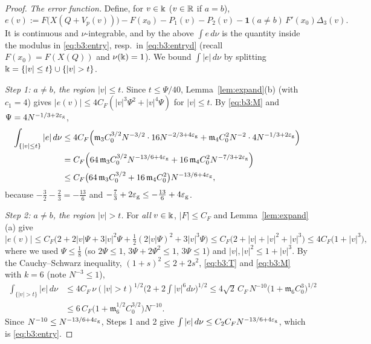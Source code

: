 \begin{proof}
\emph{The error function.} Define, for $v\in\Bbbk$ ($v\in\mathbb{R}$ if $a=b$),
\[
e(v):=F\big(X(Q+V_p(v))\big)-F(x_0)-P_1(v)-P_2(v)-\mathbf 1(a\ne b)\,F'(x_0)\Delta_3(v).
\]
It is continuous and $\nu$-integrable, and by the above $\int e\,d\nu$ is the quantity inside the modulus in \eqref{eq:b3:entry}, resp.\ in \eqref{eq:b3:entryd}
(recall $F(x_0)=F(X(Q))$ and $\nu(\Bbbk)=1$). We bound
$\int|e|\,d\nu$ by splitting $\K=\{|v|\le t\}\cup\{|v|>t\}$.

\emph{Step 1: $a\ne b$, the region $|v|\le t$.} Since $t\le\Psi/40$, Lemma~\ref{lem:expand}(b) (with $c_1=4$) gives $|e(v)|\le4C_F(|v|^3\Psi^2+|v|^4\Psi)$ for $|v|\le t$. By \eqref{eq:b3:M}
and $\Psi=4N^{-1/3+2\varepsilon_{\mathrm g}}$,
\begin{align*}
\int_{\{|v|\le t\}}|e|\,d\nu&\le4C_F\Big(\mathfrak m_3C_0^{3/2}N^{-3/2}\cdot16N^{-2/3+4\varepsilon_{\mathrm g}}+\mathfrak m_4C_0^2N^{-2}\cdot4N^{-1/3+2\varepsilon_{\mathrm g}}\Big)\\
&=C_F\Big(64\,\mathfrak m_3C_0^{3/2}N^{-13/6+4\varepsilon_{\mathrm g}}+16\,\mathfrak m_4C_0^2N^{-7/3+2\varepsilon_{\mathrm g}}\Big)\\
&\le C_F\big(64\,\mathfrak m_3C_0^{3/2}+16\,\mathfrak m_4C_0^2\big)N^{-13/6+4\varepsilon_{\mathrm g}},
\end{align*}
because $-\frac32-\frac23=-\frac{13}6$ and $-\frac73+2\varepsilon_{\mathrm g}\le-\frac{13}6+4\varepsilon_{\mathrm g}$.

\emph{Step 2: $a\ne b$, the region $|v|>t$.} For \emph{all} $v\in\Bbbk$, $|F|\le C_F$ and Lemma~\ref{lem:expand}(a) give
\[
|e(v)|\le C_F\Big(2+2|v|\Psi+3|v|^2\Psi+\tfrac12(2|v|\Psi)^2+3|v|^3\Psi\Big)\le C_F\big(2+|v|+|v|^2+|v|^3\big)\le4C_F\big(1+|v|^3\big),
\]
where we used $\Psi\le\frac18$ (so $2\Psi\le1$, $3\Psi+2\Psi^2\le1$, $3\Psi\le1$) and $|v|,|v|^2\le1+|v|^3$. By the Cauchy--Schwarz inequality, $(1+s)^2\le2+2s^2$, \eqref{eq:b3:T} and \eqref{eq:b3:M} with $k=6$ (note $N^{-3}\le1$),
\begin{align*}
\int_{\{|v|>t\}}|e|\,d\nu&\le4C_F\,\nu(|v|>t)^{1/2}\Big(2+2\!\int|v|^6d\nu\Big)^{1/2}\le4\sqrt2\,C_F\,N^{-10}\big(1+\mathfrak m_6C_0^3\big)^{1/2}\\
&\le6\,C_F\big(1+\mathfrak m_6^{1/2}C_0^{3/2}\big)N^{-10}.
\end{align*}
Since $N^{-10}\le N^{-13/6+4\varepsilon_{\mathrm g}}$, Steps 1 and 2 give $\int|e|\,d\nu\le C_2C_FN^{-13/6+4\varepsilon_{\mathrm g}}$, which is \eqref{eq:b3:entry}.


\end{proof}
